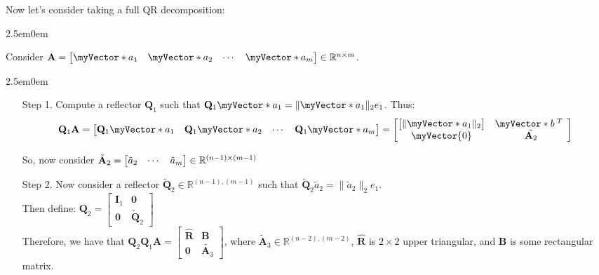 \documentclass{book}
\newcommand{\hTwo}{%
   \color{MidnightBlue}%
   \fontsize{13}{15}\selectfont%
}
\newenvironment{myIndent}{%
   \begin{adjustwidth}{2.5em}{0em}%
}{%
   \end{adjustwidth}%
}
\newcommand{\retTwo}{\hfill\bigbreak}
\newcommand{\mVec}[1]{\myVector{#1}}
\newcommand{\mVecAst}[1]{\myVector*{#1}}
\newcommand{\mMat}[1]{\mathbf{#1}}
\begin{document}
   Now let's consider taking a full QR decomposition:\\
   {\begin{myIndent} \hTwo
      Consider $\mMat{A} = \begin{bmatrix} \mVecAst{a}_1 & \mVecAst{a}_2 & \cdots & \mVecAst{a}_m \end{bmatrix} \in \mathbb{R}^{n \times m}$.
      
      \begin{myIndent}
         \begin{itemize}
            \item[{\color{BrickRed}Step 1.}] Compute a reflector $\mMat{Q}_1$ such that $\mMat{Q}_1\mVecAst{a}_1 = \|\mVecAst{a}_1\|_2e_1$. Thus:
            \[\mMat{Q}_1\mMat{A} = \begin{bmatrix} \mMat{Q}_1\mVecAst{a}_1 & \mMat{Q}_1\mVecAst{a}_2 & \cdots & \mMat{Q}_1\mVecAst{a}_m \end{bmatrix} = 
            \begin{bmatrix}
               \begin{bmatrix}
                  \|\mVecAst{a}_1\|_2
               \end{bmatrix} & \mVecAst{b}^{\phantom{|}T\phantom{1}} \\
               \mVec{0} & \tilde{\mMat{A}_2}
            \end{bmatrix}\]
   
            So, now consider $\tilde{\mMat{A}}_2 = \begin{bmatrix}\Tilde{a}_2 & \cdots & \Tilde{a}_m \end{bmatrix} \in \mathbb{R}^{(n-1) \times (m-1)}$ \retTwo
   
            \item[{\color{BrickRed}Step 2.}] Now consider a reflector $\tilde{\mMat{Q}}_2 \in \mathbb{R}^{(n-1), (m-1)}$ such that $\tilde{\mMat{Q}}_2\tilde{a}_2 = \|\tilde{a}_2\|_2e_1$.\\
            Then define: ${\displaystyle \mMat{Q}_2 = \begin{bmatrix} \mMat{I}_1 & \mMat{0} \\ \mMat{0} & \tilde{\mMat{Q}}_2\end{bmatrix}}$\\
            Therefore, we have that
            $\mMat{Q}_2\mMat{Q}_1\mMat{A} = 
            \begin{bmatrix}
               \hat{\mMat{R}} & \mMat{B} \\ \mMat{0} & \tilde{\mMat{A}_3}
            \end{bmatrix}$, where $\tilde{\mMat{A}}_3 \in \mathbb{R}^{(n-2),(m-2)}$, $\hat{\mMat{R}}$ is $2 \times 2$ upper triangular, and $\mMat{B}$ is some rectangular matrix.
            

\end{itemize}
\end{myIndent}
\end{myIndent}}
\end{document}
